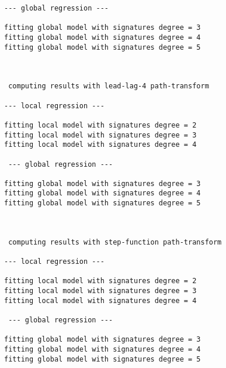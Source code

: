 \documentclass[11pt]{article}
\begin{document}
\begin{Verbatim}[commandchars=\\\{\}]
 --- global regression --- 

fitting global model with signatures degree = 3
fitting global model with signatures degree = 4
fitting global model with signatures degree = 5

 
 
 computing results with lead-lag-4 path-transform 

--- local regression --- 

fitting local model with signatures degree = 2
fitting local model with signatures degree = 3
fitting local model with signatures degree = 4

 --- global regression --- 

fitting global model with signatures degree = 3
fitting global model with signatures degree = 4
fitting global model with signatures degree = 5

 
 
 computing results with step-function path-transform 

--- local regression --- 

fitting local model with signatures degree = 2
fitting local model with signatures degree = 3
fitting local model with signatures degree = 4

 --- global regression --- 

fitting global model with signatures degree = 3
fitting global model with signatures degree = 4
fitting global model with signatures degree = 5

    \end{Verbatim}
\end{document}
